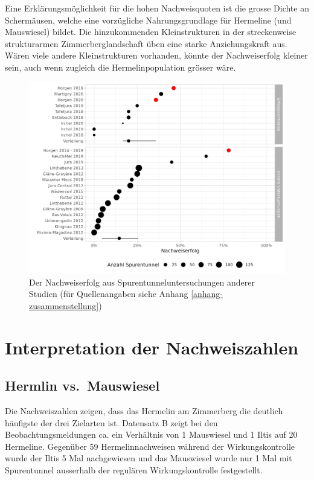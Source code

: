 \documentclass[
  oneside]{scrbook}
\begin{document}
Eine Erklärungsmöglichkeit für die hohen Nachweisquoten ist die grosse Dichte an Schermäusen, welche eine vorzügliche Nahrungsgrundlage für Hermeline (und Mauswiesel) bildet. Die hinzukommenden Kleinstrukturen in der streckenweise strukturarmen Zimmerberglandschaft üben eine starke Anziehungskraft aus. Wären viele andere Kleinstrukturen vorhanden, könnte der Nachweiserfolg kleiner sein, auch wenn zugleich die Hermelinpopulation grösser wäre.



\begin{figure}
\includegraphics[width=1\linewidth]{images/kontext} \caption{Der Nachweiserfolg aus Spurentunneluntersuchungen anderer Studien (für Quellenangaben siehe Anhang \ref{anhang-zusammenstellung})}\label{fig:kontext}
\end{figure}

\hypertarget{interpretation-der-nachweiszahlen}{%
\section{Interpretation der Nachweiszahlen}\label{interpretation-der-nachweiszahlen}}

\hypertarget{hermlin-vs.-mauswiesel}{%
\subsection{Hermlin vs.~Mauswiesel}\label{hermlin-vs.-mauswiesel}}

Die Nachweiszahlen zeigen, dass das Hermelin am Zimmerberg die deutlich häufigste der drei Zielarten ist. Datensatz B zeigt bei den Beobachtungsmeldungen ca. ein Verhältnis von 1 Mauswiesel und 1 Iltis auf 20 Hermeline.
Gegenüber 59 Hermelinnachweisen während der Wirkungskontrolle wurde der Iltis 5 Mal nachgewiesen und das Mauswiesel wurde nur 1 Mal mit Spurentunnel ausserhalb der regulären Wirkungskontrolle festgestellt.
\end{document}
